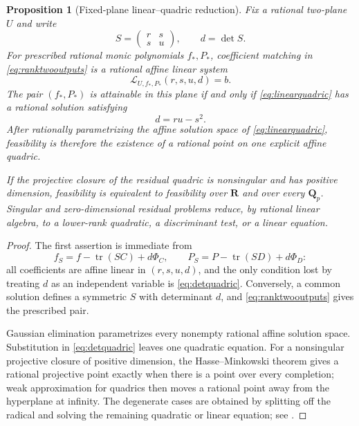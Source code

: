 \documentclass[11pt,reqno]{amsart}
\newtheorem{proposition}[theorem]{Proposition}
\theoremstyle{definition}
\theoremstyle{remark}
\DeclareMathOperator{\tr}{tr}
\newcommand{\Q}{\mathbf Q}
\newcommand{\R}{\mathbf R}
\begin{document}
\begin{proposition}[Fixed-plane linear--quadric reduction]
\label{prop:fixed-plane-quadric}
Fix a rational two-plane $U$ and write
\[
 S=\begin{pmatrix}r&s\\s&u\end{pmatrix},\qquad d=\det S.
\]
For prescribed rational monic polynomials $f_*,P_*$, coefficient matching in
\eqref{eq:ranktwooutputs} is a rational affine linear system
\begin{equation}\label{eq:linearquadric}
 \mathcal L_{U,f_*,P_*}(r,s,u,d)=b.
\end{equation}
The pair $(f_*,P_*)$ is attainable in this plane if and only if
\eqref{eq:linearquadric} has a rational solution satisfying
\begin{equation}\label{eq:detquadric}
 d=ru-s^2.
\end{equation}
After rationally parametrizing the affine solution space of
\eqref{eq:linearquadric}, feasibility is therefore the existence of a
rational point on one explicit affine quadric.

If the projective closure of the residual quadric is nonsingular and has
positive dimension, feasibility is equivalent to feasibility over $\R$ and
over every $\Q_p$.  Singular and zero-dimensional residual problems reduce,
by rational linear algebra, to a lower-rank quadratic, a discriminant test,
or a linear equation.
\end{proposition}

\begin{proof}
The first assertion is immediate from
\[
 f_S=f-\tr(SC)+d\Phi_C,\qquad
 P_S=P-\tr(SD)+d\Phi_D:
\]
all coefficients are affine linear in $(r,s,u,d)$, and the only condition
lost by treating $d$ as an independent variable is
\eqref{eq:detquadric}.  Conversely, a common solution defines a symmetric
$S$ with determinant $d$, and \eqref{eq:ranktwooutputs} gives the prescribed
pair.

Gaussian elimination parametrizes every nonempty rational affine solution
space.  Substitution in \eqref{eq:detquadric} leaves one quadratic equation.
For a nonsingular projective closure of positive dimension, the
Hasse--Minkowski theorem gives a rational projective point exactly when there
is a point over every completion; weak approximation for quadrics then moves
a rational point away from the hyperplane at infinity.  The degenerate cases
are obtained by splitting off the radical and solving the remaining
quadratic or linear equation; see \cite{cassels}.
\end{proof}
\end{document}
